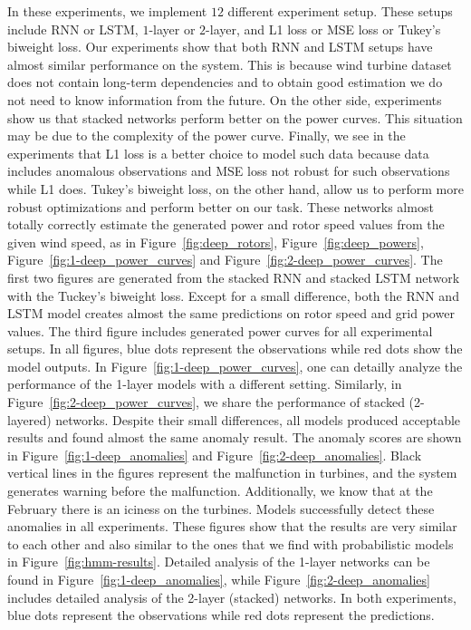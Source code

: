 In these experiments, we implement $12$ different experiment setup. 
These setups include RNN or LSTM, $1$-layer or $2$-layer, and L1 loss or MSE loss or Tukey's biweight loss.
Our experiments show that both RNN and LSTM setups have almost similar performance on the system.
This is because wind turbine dataset does not contain long-term dependencies and to obtain good estimation we do not need to know information from the future. 
On the other side, experiments show us that stacked networks perform better on the power curves.
This situation may be due to the complexity of the power curve.
Finally, we see in the experiments that L1 loss is a better choice to model such data because data includes anomalous observations and MSE loss not robust for such observations while L1 does.
Tukey's biweight loss, on the other hand, allow us to perform more robust optimizations and perform better on our task.
These networks almost totally correctly estimate the generated power and rotor speed values from the given wind speed, as in Figure~\ref{fig:deep_rotors}, Figure~\ref{fig:deep_powers}, Figure~\ref{fig:1-deep_power_curves} and Figure~\ref{fig:2-deep_power_curves}. 
The first two figures are generated from the stacked RNN and stacked LSTM network with the Tuckey's biweight loss.
Except for a small difference, both the RNN and LSTM model creates almost the same predictions on rotor speed and grid power values.
The third figure includes generated power curves for all experimental setups. In all figures, blue dots represent the observations while red dots show the model outputs.
In Figure~\ref{fig:1-deep_power_curves}, one can detailly analyze the performance of the 1-layer models with a different setting.
Similarly, in Figure~\ref{fig:2-deep_power_curves}, we share the performance of stacked (2-layered) networks.
Despite their small differences, all models produced acceptable results and found almost the same anomaly result. The anomaly scores are shown in Figure~\ref{fig:1-deep_anomalies} and Figure~\ref{fig:2-deep_anomalies}. 
Black vertical lines in the figures represent the malfunction in turbines, and the system generates warning before the malfunction.
Additionally, we know that at the February there is an iciness on the turbines. 
Models successfully detect these anomalies in all experiments.
These figures show that the results are very similar to each other and also similar to the ones that we find with probabilistic models in Figure~\ref{fig:hmm-results}.
Detailed analysis of the 1-layer networks can be found in Figure~\ref{fig:1-deep_anomalies}, while Figure~\ref{fig:2-deep_anomalies} includes detailed analysis of the 2-layer (stacked) networks.
In both experiments, blue dots represent the observations while red dots represent the predictions.

